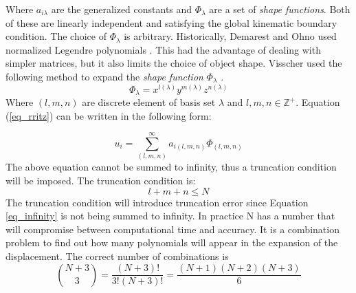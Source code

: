 \begin{doublespacing}
Where $a_{i\lambda}$ are the generalized constants and $\Phi_\lambda$ are a set of \textit{shape functions}. Both of these are linearly independent and satisfying the global kinematic boundary condition. The choice of $\Phi_\lambda$ is arbitrary. Historically, Demarest and Ohno used normalized Legendre polynomials \cite{demarest1971cube} \cite{ohno1976free}. This had the advantage of dealing with simpler matrices, but it also limits the choice of object shape. Visscher used the following method to expand the \textit{shape function} $\Phi_\lambda$ \cite{visscher1991normal}.
\begin{equation}
\label{eq_shapefunction}
\Phi_\lambda =  x^{l(\lambda)}y^{m(\lambda)}z^{n(\lambda)}
\end{equation}
Where $(l,m,n)$ are discrete element of basis set $\lambda$ and $l, m, n \in \mathbb{Z}^+$. Equation (\ref{eq_rritz}) can be written in the following form:



\begin{equation}
\label{eq_infinity}
u_i = \sum_{(l,m,n)}^\infty a_{i(l,m,n)} \Phi_{(l,m,n)}
\end{equation}
The above equation cannot be summed to infinity, thus a truncation condition will be imposed. The truncation condition is:
\begin{equation}
\label{eq_truncation}
l+m+n \le N
\end{equation}
The truncation condition will introduce truncation error since Equation \ref{eq_infinity} is not being summed to infinity. In practice N has a number that will compromise between computational time and accuracy. It is a combination problem to find out how many polynomials will appear in the expansion of the displacement. The correct number of combinations is 
\begin{equation}
\binom{N+3}{3} = \frac{(N+3)!}{3!(N+3)!} = \frac{(N+1)(N+2)(N+3)}{6}
\end{equation}


\end{doublespacing}

